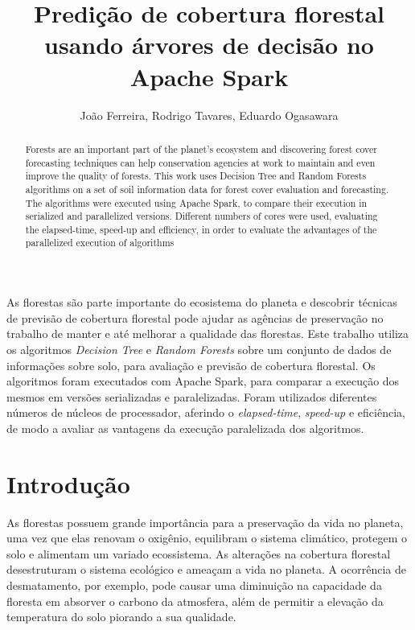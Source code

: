 \documentclass[12pt]{article}
\title{Predição de cobertura florestal usando árvores de decisão no Apache Spark}
\author{João Ferreira\inst{1}, Rodrigo Tavares\inst{1}, Eduardo Ogasawara\inst{1} }
\begin{document}
 

\maketitle

\begin{abstract}
Forests are an important part of the planet's ecosystem and discovering forest cover forecasting techniques can help conservation agencies at work to maintain and even improve the quality of forests. This work uses Decision Tree and Random Forests algorithms on a set of soil information data for forest cover evaluation and forecasting. The algorithms were executed using Apache Spark, to compare their execution in serialized and parallelized versions. Different numbers of cores were used, evaluating the elapsed-time, speed-up and efficiency, in order to evaluate the advantages of the parallelized execution of algorithms
\end{abstract}
     
\begin{resumo} 
As florestas são parte importante do ecosistema do planeta e descobrir técnicas de previsão de cobertura florestal pode ajudar as agências de preservação no trabalho de manter e até melhorar a qualidade das florestas. Este trabalho utiliza os algoritmos {\it Decision Tree} e {\it Random Forests} sobre um conjunto de dados de informações sobre solo, para avaliação e previsão de cobertura florestal. Os algoritmos foram executados com Apache Spark, para comparar a execução dos mesmos em versões serializadas e paralelizadas. Foram utilizados diferentes números de núcleos de processador, aferindo o {\it elapsed-time}, {\it speed-up} e eficiência, de modo a avaliar as vantagens da execução paralelizada dos algoritmos.
\end{resumo}


\section{Introdução}

As florestas possuem grande importância para a preservação da vida no planeta, uma vez que elas renovam o oxigênio, equilibram o sistema climático, protegem o solo e alimentam um variado ecossistema. As alterações na cobertura florestal desestruturam o sistema ecológico e ameaçam a vida no planeta. A ocorrência de desmatamento, por exemplo, pode causar uma diminuição na capacidade da floresta em absorver o carbono da atmosfera, além de permitir a elevação da temperatura do solo piorando a sua qualidade. 
\end{document}
